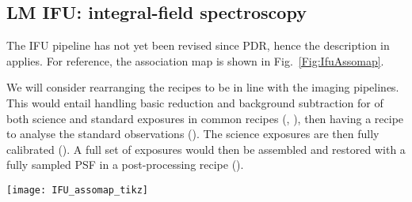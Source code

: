 \subsection{LM IFU: integral-field spectroscopy}
\label{ssec:overview_ifu}

The IFU pipeline has not yet been revised since PDR, hence the
description in \cite{DRLS} applies. For reference, the association map
is shown in Fig.~\ref{Fig:IfuAssomap}.

We will consider rearranging the recipes to be in line with the
imaging pipelines. This would entail handling basic reduction and
background subtraction for of both science and standard exposures in
common recipes (, ),
then having a recipe to analyse the standard observations
(). The science exposures are then fully
calibrated (). A full set of exposures would
then be assembled and restored with a fully sampled PSF in a
post-processing recipe ().

\begin{sidewaysfigure}[ht]
  \centering
  \texttt{[image: IFU\_assomap\_tikz]}
  \caption[Reduction cascade and association map for IFU
  spectroscopy]{%
    Association map for IFU spectroscopy in L- and M-band. The
    figure shows only the primary products created by each recipe; for
    a full list of products refer to the recipe descriptions in
    Sect.~\ref{ssec:IFU_recipes}. The dashed line separates
    calibration tasks that are done at AIT or infrequently during
    operations from tasks done daily. The prefix ``'' has been
    omitted from the recipe names to improve clarity.}
  \label{Fig:IfuAssomap}
\end{sidewaysfigure}




